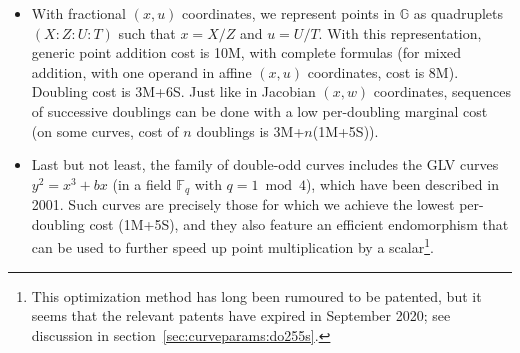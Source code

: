 \documentclass{llncs}
\newcommand{\bF}{\mathbb{F}}
\newcommand{\bG}{\mathbb{G}}
\begin{document}
\begin{itemize}
    \item With fractional $(x, u)$ coordinates, we represent points in
    $\bG$ as quadruplets $(X{:}Z{:}U{:}T)$ such that $x = X/Z$ and
    $u = U/T$. With this representation, generic point addition cost is
    10M, with complete formulas (for mixed addition, with one operand
    in affine $(x, u)$ coordinates, cost is 8M). Doubling cost is 3M+6S.
    Just like in Jacobian $(x, w)$ coordinates, sequences of successive
    doublings can be done with a low per-doubling marginal cost (on
    some curves, cost of $n$ doublings is 3M+$n$(1M+5S)).

    \item Last but not least, the family of double-odd curves includes
    the GLV curves $y^2 = x^3 + bx$ (in a field $\bF_q$ with $q = 1\bmod
    4$), which have been described in 2001\cite{GalLamVan2001}. Such
    curves are precisely those for which we achieve the lowest
    per-doubling cost (1M+5S), and they also feature an efficient
    endomorphism that can be used to further speed up point
    multiplication by a scalar\footnote{This optimization method has
    long been rumoured to be patented, but it seems that the relevant
    patents have expired in September 2020; see discussion in
    section~\ref{sec:curveparams:do255s}.}.

\end{itemize}
\end{document}
